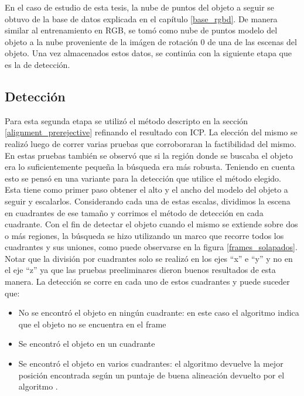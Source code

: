 En el caso de estudio de esta tesis, la nube de puntos del objeto a seguir se obtuvo de la base de datos explicada en el capítulo \ref{base_rgbd}. De manera similar al entrenamiento en RGB, se tomó como nube de puntos modelo del objeto a la nube proveniente de la imágen de rotación 0 de una de las escenas del objeto. Una vez almacenados estos datos, se continúa con la siguiente etapa que es la de detección.


\subsection{Detección}\label{deteccion_d}
Para esta segunda etapa se utilizó el método descripto en la sección \ref{alignment_prerejective} refinando el resultado con ICP. La elección del mismo se realizó luego de correr varias pruebas que corroboraran la factibilidad del mismo. En estas pruebas también se observó que si la región donde se buscaba el objeto era lo suficientemente pequeña la búsqueda era más robusta. Teniendo en cuenta esto se pensó en una variante para la detección que utilice el método elegido. Esta tiene como primer paso obtener el alto y el ancho del modelo del objeto a seguir y escalarlos. Considerando cada una de estas escalas, dividimos la escena en cuadrantes de ese tamaño y corrimos el método de detección en cada cuadrante. Con el fin de detectar el objeto cuando el mismo se extiende sobre dos o más regiones, la búsqueda se hizo utilizando un marco que recorre todos los cuadrantes y sus uniones, como puede observarse en la figura \ref{frames_solapados}. Notar que la división por cuadrantes solo se realizó en los ejes ``x'' e ``y'' y no en el eje ``z'' ya que las pruebas preeliminares dieron buenos resultados de esta manera. La detección se corre en cada uno de estos cuadrantes y puede suceder que:
\begin{itemize}
	\item No se encontró el objeto en ningún cuadrante: en este caso el algoritmo indica que el objeto no se encuentra en el frame
	\item Se encontró el objeto en un cuadrante
	\item Se encontró el objeto en varios cuadrantes: el algoritmo devuelve la mejor posición encontrada según un puntaje de buena alineación devuelto por el algoritmo \ap.
\end{itemize}

